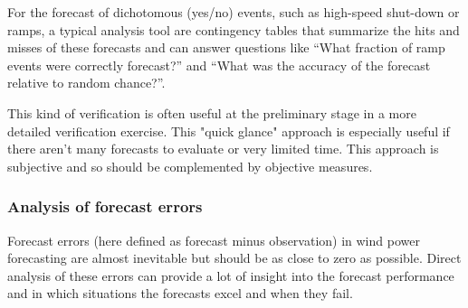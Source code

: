 For the forecast of dichotomous (yes/no) events, such as  high-speed shut-down or ramps, a typical analysis tool are contingency tables that summarize the hits and misses of these forecasts and can answer questions like ``What fraction of ramp events were correctly forecast?'' and ``What was the accuracy of the forecast relative to random chance?''.

\color[red]{Example contingency table}

This kind of verification is often useful at the preliminary stage in a more detailed verification exercise. This "quick glance" approach is especially useful if there aren't many forecasts to evaluate or very limited time. This approach is subjective and so should be complemented by objective measures. 








\subsubsection{Analysis of forecast errors}
Forecast errors (here defined as forecast minus observation) in wind power forecasting are almost inevitable but should be as close to zero as possible. 
Direct analysis of these errors can provide a lot of insight into the forecast performance and in which situations the forecasts excel and when they fail.

